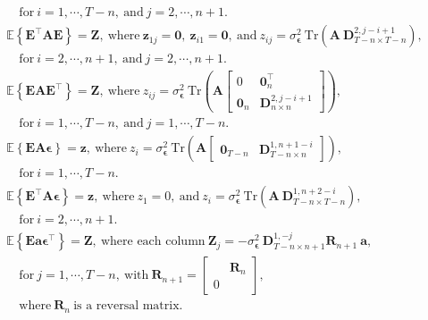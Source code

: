 \begin{lem}
\begin{equation*}
\begin{aligned}
& \quad \text{for} \ i = 1, \cdots, T-n, \ \text{and} \ j = 2, \cdots, n+1. \\
& \mathbb{E} \left\{ \mathbf{E}^\top \mathbf{A} \mathbf{E} \right\} = \mathbf{Z}, \ 
\text{where} \ \mathbf{z}_{1j} = \mathbf{0}, \ \mathbf{z}_{i1} = \mathbf{0}, \ \text{and} \ 
z_{ij} = \sigma_{\bm{\epsilon}}^2 \ \mathrm{Tr} \left( \mathbf{A} \ \mathbf{D}_{T-n \times T-n}^{2, j-i+1} \right) , \\
& \quad \text{for} \ i = 2, \cdots, n+1, \ \text{and} \ j=2, \cdots, n+1 . \\ 
& \mathbb{E} \left\{ \mathbf{E} \mathbf{A} \mathbf{E}^\top \right\} = \mathbf{Z}, \
\text{where} \ z_{ij} = \sigma_{\bm{\epsilon}}^2 \ \mathrm{Tr} \left( \mathbf{A} \begin{bmatrix} 0 & \mathbf{0}_{n}^\top \\ \mathbf{0}_{n} & \mathbf{D}_{n \times n}^{2, j-i+1} \end{bmatrix} \right), \\
& \quad \text{for} \ i = 1,\cdots,T-n, \ \text{and} \ j=1,\cdots,T-n. \\ 
& \mathbb{E} \left\{ \mathbf{E} \mathbf{A} \bm{\epsilon} \right\} = \mathbf{z}, \
\text{where} \ z_i = \sigma_{\bm{\epsilon}}^2 \ \mathrm{Tr} \left( \mathbf{A} \begin{bmatrix} \mathbf{0}_{T-n} & \mathbf{D}_{T-n \times n}^{1,n+1-i} \end{bmatrix} \right) , \\
& \quad \text{for} \ i = 1,\cdots,T-n . \\
& \mathbb{E} \left\{ \mathbf{E}^\top \mathbf{A} \bm{\epsilon} \right\} = \mathbf{z}, \
\text{where} \ z_1 = 0, \ \text{and} \ z_i = \sigma_{\bm{\epsilon}}^2 \ \mathrm{Tr} \left( \mathbf{A} \ \mathbf{D}_{T-n \times T-n}^{1, n+2-i} \right), \\
& \quad \text{for} \ i = 2,\cdots,n+1 . \\
& \mathbb{E} \left\{ \mathbf{E} \mathbf{a} \bm{\epsilon}^\top \right\} = \mathbf{Z}, \
\text{where each column} \ \mathbf{Z}_{j} = - \sigma_{\bm{\epsilon}}^2 \ \mathbf{D}_{T-n \times n+1}^{1,-j} \mathbf{R}_{n+1} \ \mathbf{a} , \\
& \quad \text{for} \ j = 1,\cdots,T-n , \ \text{with} \ \mathbf{R}_{n+1} = \begin{bmatrix} & \mathbf{R}_n \\ 0 \end{bmatrix} , \\ & \quad
\text{where} \ \mathbf{R}_n \ \text{is a reversal matrix.}
\end{aligned} \end{equation*} 
\end{lem}

